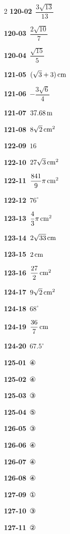 \documentclass[10pt,a4paper]{article}
\begin{document}
\begin{multicols}{2}
\noindent\textbf{120-02}\ $\dfrac{3\sqrt{13}}{13}$\par
\noindent\textbf{120-03}\ $\dfrac{2\sqrt{10}}{7}$\par
\noindent\textbf{120-04}\ $\dfrac{\sqrt{15}}{5}$\par
\noindent\textbf{121-05}\ $(\sqrt{3}+3)\mkern3mu \mathrm{cm}$\par
\noindent\textbf{121-06}\ $-\dfrac{3\sqrt{6}}{4}$\par
\noindent\textbf{121-07}\ $37.68\mkern3mu \mathrm{m}$\par
\noindent\textbf{121-08}\ $8\sqrt{2}\mkern3mu \mathrm{cm}^2$\par
\noindent\textbf{122-09}\ $16$\par
\noindent\textbf{122-10}\ $27\sqrt{3}\mkern3mu \mathrm{cm}^2$\par
\noindent\textbf{122-11}\ $\dfrac{841}{9}\pi\mkern3mu \mathrm{cm}^2$\par
\noindent\textbf{122-12}\ $76^\circ$\par
\noindent\textbf{123-13}\ $\dfrac{4}{3}\pi\mkern3mu \mathrm{cm}^2$\par
\noindent\textbf{123-14}\ $2\sqrt{33}\mkern3mu \mathrm{cm}$\par
\noindent\textbf{123-15}\ $2\mkern3mu \mathrm{cm}$\par
\noindent\textbf{123-16}\ $\dfrac{27}{2}\mkern3mu \mathrm{cm}^2$\par
\noindent\textbf{124-17}\ $9\sqrt{2}\mkern3mu \mathrm{cm}^2$\par
\noindent\textbf{124-18}\ $68^\circ$\par
\noindent\textbf{124-19}\ $\dfrac{36}{7}\mkern3mu \mathrm{cm}$\par
\noindent\textbf{124-20}\ $67.5^\circ$\par
\noindent\textbf{125-01}\ ④\par
\noindent\textbf{125-02}\ ④\par
\noindent\textbf{125-03}\ ③\par
\noindent\textbf{125-04}\ ⑤\par
\noindent\textbf{126-05}\ ③\par
\noindent\textbf{126-06}\ ④\par
\noindent\textbf{126-07}\ ④\par
\noindent\textbf{126-08}\ ④\par
\noindent\textbf{127-09}\ ①\par
\noindent\textbf{127-10}\ ③\par
\noindent\textbf{127-11}\ ②\par

\end{multicols}
\end{document}
